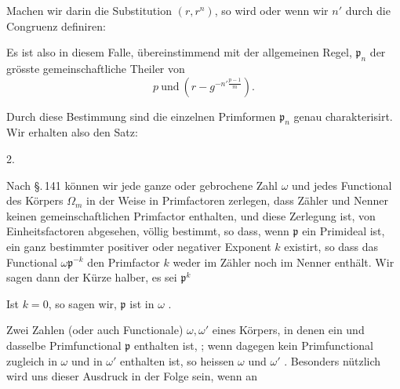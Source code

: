 Machen wir darin die Substitution $(r, r^n)$, so wird
oder wenn wir $n'$ durch die Congruenz
definiren:

Es ist also in diesem Falle, übereinstimmend mit der allgemeinen
 Regel, $\mathfrak p_n$ der grösste gemeinschaftliche Theiler von
\[
p \ \text{und} \ \left(r - g^{-n'\frac{p-1}{m}}\right).
\]

Durch diese Bestimmung sind die einzelnen Primformen $\mathfrak p_n$
genau charakterisirt. Wir erhalten also den Satz:

2. 

Nach \S.\,141 können wir jede ganze oder gebrochene Zahl $\omega$
und jedes Functional des Körpers $\Omega_m$ in der Weise in Primfactoren
 zerlegen, dass Zähler und Nenner keinen gemeinschaftlichen
 Primfactor enthalten, und diese Zerlegung ist, von
Einheitsfactoren abgesehen, völlig bestimmt, so dass, wenn
$\mathfrak p$ ein Primideal ist, ein ganz bestimmter positiver oder negativer
Exponent $k$ existirt, so dass das Functional $\omega \mathfrak p^{-k}$ den Primfactor
 $k$ weder im Zähler noch im Nenner enthält. %
Wir sagen
dann der Kürze halber, es sei $\mathfrak p^k$ 

Ist $k=0$, so sagen wir, $\mathfrak p$ ist in $\omega$ .

Zwei Zahlen (oder auch Functionale) $\omega, \omega'$ eines Körpers, in
denen ein und dasselbe Primfunctional $\mathfrak p$ enthalten ist, ; wenn dagegen
kein Primfunctional zugleich in $\omega$ und in $\omega'$ enthalten ist, so
heissen $\omega$ und $\omega'$ . Besonders nützlich
wird uns dieser Ausdruck in der Folge sein, wenn an
